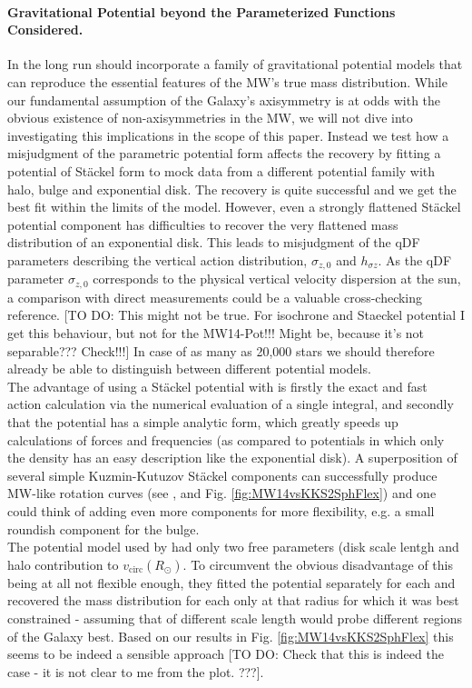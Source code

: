 \paragraph{Gravitational Potential beyond the Parameterized Functions Considered.}  In the long run \RM should incorporate a family of gravitational potential models that can reproduce the essential features of the MW's true mass distribution. While our fundamental assumption of the Galaxy's axisymmetry is at odds with the obvious existence of non-axisymmetries in the MW, we will not dive into investigating this implications in the scope of this paper. Instead we test how a misjudgment of the parametric potential form affects the recovery by fitting a potential of St\"{a}ckel form \citep{bat94} to mock data from a different potential family with halo, bulge and exponential disk. The recovery is quite successful and we get the best fit within the limits of the model. However, even a strongly flattened St\"{a}ckel potential component has difficulties to recover the very flattened mass distribution of an exponential disk. This leads to misjudgment of the qDF parameters describing the vertical action distribution, $\sigma_{z,0}$ and $h_{\sigma z}$. As the qDF parameter $\sigma_{z,0}$ corresponds to the physical vertical velocity dispersion at the sun, a comparison with direct measurements could be a valuable cross-checking reference. [TO DO: This might not be true. For isochrone and Staeckel potential I get this behaviour, but not for the MW14-Pot!!! Might be, because it's not separable??? Check!!!] In case of as many as 20,000 stars we should therefore already be able to distinguish between different potential models.
\\The advantage of using a St\"{a}ckel potential with \RM is firstly the exact and fast action calculation via the numerical evaluation of a single integral, and secondly that the potential has a simple analytic form, which greatly speeds up calculations of forces and frequencies (as compared to potentials in which only the density has an easy description like the exponential disk). A superposition of several simple Kuzmin-Kutuzov St\"{a}ckel components can successfully produce MW-like rotation curves (see \citet{bat94}, \citet{fam03} and Fig. \ref{fig:MW14vsKKS2SphFlex}) and one could think of adding even more components for more flexibility, e.g. a small roundish component for the bulge.
\\The potential model used by \citet{bov13} had only two free parameters (disk scale lentgh and halo contribution to $v_\text{circ}(R_\odot)$. To circumvent the obvious disadvantage of this being at all not flexible enough, they fitted the potential separately for each \MAP and recovered the mass distribution for each \MAP only at that radius for which it was best constrained - assuming that \MAPs of different scale length would probe different regions of the Galaxy best. Based on our results in Fig. \ref{fig:MW14vsKKS2SphFlex} this seems to be indeed a sensible approach [TO DO: Check that this is indeed the case - it is not clear to me from the plot. ???].
